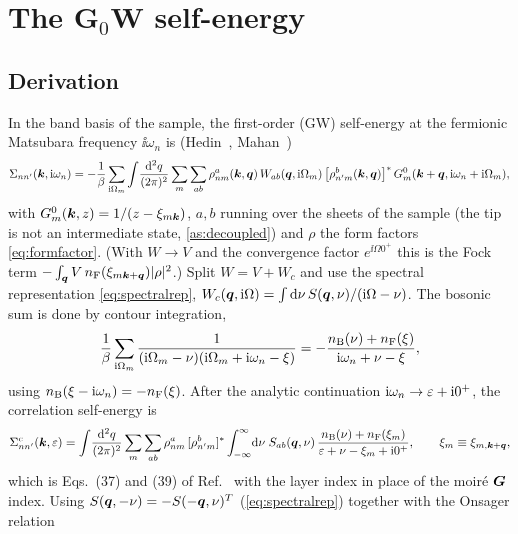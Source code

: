 \section{The G$_0$W self-energy}
\label{sec:selfenergy}

\subsection{Derivation}
\label{sec:sigma_derivation}

In the band basis of the sample, the first-order (GW) self-energy at the fermionic Matsubara frequency
$\ii\omega_n$ is (Hedin~\cite{Hedin1965}, Mahan~\cite{Mahan})
\begin{equation}
\Sigma_{nn'}(\bm k,\mathrm i\omega_n)=-\frac1\beta\sum_{\mathrm i\Omega_m}\int\!\frac{\mathrm d^2q}{(2\pi)^2}\sum_m\sum_{ab}
\rho^a_{nm}(\bm k,\bm q)\,W_{ab}(\bm q,\mathrm i\Omega_m)\,\bigl[\rho^b_{n'm}(\bm k,\bm q)\bigr]^*\,
G^0_m(\bm k+\bm q,\mathrm i\omega_n+\mathrm i\Omega_m),
\label{eq:sigma_matsubara}
\end{equation}
with $G^0_m(\bm k,z)=1/(z-\xi_{m\bm k})$, $a,b$ running over the sheets of the sample (the tip is not an
intermediate state, \cref{as:decoupled}) and $\rho$ the form factors \eqref{eq:formfactor}. (With $W\to V$ and
the convergence factor $e^{\ii\Omega0^+}$ this is the Fock term $-\int_{\bm q}V\,n_{\rm F}(\xi_{m\bm k+\bm q})|\rho|^2$.)
Split $W=V+W_c$ and use the spectral representation \eqref{eq:spectralrep},
$W_c(\bm q,\mathrm i\Omega)=\int\mathrm d\nu\,S(\bm q,\nu)/(\mathrm i\Omega-\nu)$. The bosonic sum is done by contour integration,
\begin{equation}
\frac1\beta\sum_{\mathrm i\Omega_m}\frac{1}{(\mathrm i\Omega_m-\nu)(\mathrm i\Omega_m+\mathrm i\omega_n-\xi)}
=-\frac{n_{\rm B}(\nu)+n_{\rm F}(\xi)}{\mathrm i\omega_n+\nu-\xi},
\end{equation}
using $n_{\rm B}(\xi-\mathrm i\omega_n)=-n_{\rm F}(\xi)$. After the analytic continuation $\mathrm i\omega_n\to\varepsilon+\mathrm i0^+$, the
correlation self-energy is
\begin{equation}
\Sigma^{c}_{nn'}(\bm k,\varepsilon)=\int\!\frac{\mathrm d^2q}{(2\pi)^2}\sum_m\sum_{ab}\rho^a_{nm}\,[\rho^b_{n'm}]^*
\int_{-\infty}^{\infty}\!\mathrm d\nu\;S_{ab}(\bm q,\nu)\,\frac{n_{\rm B}(\nu)+n_{\rm F}(\xi_m)}{\varepsilon+\nu-\xi_m+\mathrm i0^+},
\qquad\xi_m\equiv\xi_{m,\bm k+\bm q},
\label{eq:sigma_full_line}
\end{equation}
which is Eqs.~(37) and (39) of Ref.~\cite{Wei2025} with the layer index in place of the moir\'e $\bm G$ index.
Using $S(\bm q,-\nu)=-S(-\bm q,\nu)^T$ (\cref{eq:spectralrep}) together with the Onsager relation
